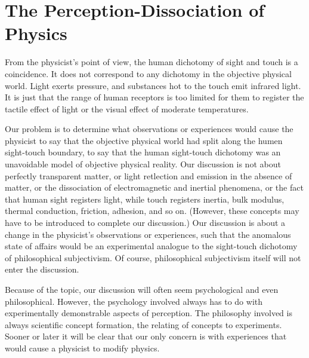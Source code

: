 \chapter{The Perception-Dissociation of Physics}


From the physicist's point of view, the human dichotomy of sight and 
touch is a coincidence. It does not correspond to any dichotomy in the 
objective physical world. Light exerts pressure, and substances hot to the 
touch emit infrared light. It is just that the range of human receptors is too 
limited for them to register the tactile effect of light or the visual effect of 
moderate temperatures. 

Our problem is to determine what observations or experiences would 
cause the physicist to say that the objective physical world had split along 
the humen sight-touch boundary, to say that the human sight-touch 
dichotomy was an unavoidable model of objective physical reality. Our 
discussion is not about perfectly transparent matter, or light retlection and 
emission in the absence of matter, or the dissociation of electromagnetic and 
inertial phenomena, or the fact that human sight registers light, while touch 
registers inertia, bulk modulus, thermal conduction, friction, adhesion, and 
so on. (However, these concepts may have to be introduced to complete our 
discussion.) Our discussion is about a change in the physicist's observations 
or experiences, such that the anomalous state of affairs would be an 
experimental analogue to the sight-touch dichotomy of philosophical 
subjectivism. Of course, philosophical subjectivism itself will not enter the 
discussion. 

Because of the topic, our discussion will often seem psychological and 
even philosophical. However, the psychology involved always has to do with 
experimentally demonstrable aspects of perception. The philosophy involved 
is always scientific concept formation, the relating of concepts to 
experiments. Sooner or later it will be clear that our only concern is with 
experiences that would cause a physicist to modify physics. 


